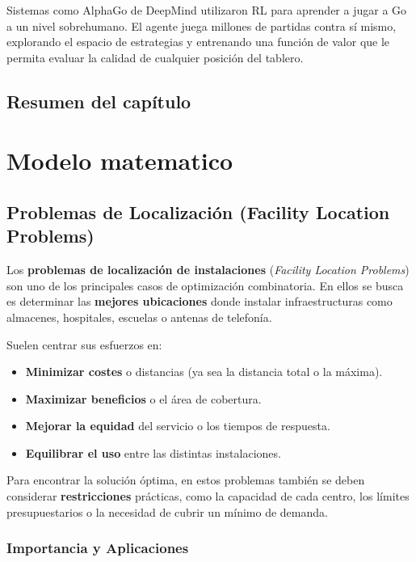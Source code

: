\documentclass[12pt,a4paper]{book}
\begin{document}
Sistemas como AlphaGo \cite{AlphaGo} de DeepMind utilizaron RL para aprender a jugar a Go a un nivel sobrehumano. El agente juega millones de partidas contra sí mismo, explorando el espacio de estrategias y entrenando una función de valor que le permita evaluar la calidad de cualquier posición del tablero.

\section{Resumen del capítulo}

\chapter{Modelo matematico}

\section{Problemas de Localización (Facility Location Problems)}

Los \textbf{problemas de localización de instalaciones} (\textit{Facility Location Problems}) son uno de los principales casos de optimización combinatoria. En ellos se busca es determinar las \textbf{mejores ubicaciones} donde instalar infraestructuras como almacenes, hospitales, escuelas o antenas de telefonía.

Suelen centrar sus esfuerzos en:
\begin{itemize}
    \item \textbf{Minimizar costes} o distancias (ya sea la distancia total o la máxima).
    \item \textbf{Maximizar beneficios} o el área de cobertura.
    \item \textbf{Mejorar la equidad} del servicio o los tiempos de respuesta.
    \item \textbf{Equilibrar el uso} entre las distintas instalaciones.
\end{itemize}

Para encontrar la solución óptima, en estos problemas también se deben considerar \textbf{restricciones} prácticas, como la capacidad de cada centro, los límites presupuestarios o la necesidad de cubrir un mínimo de demanda.

\hrulefill

\subsection{Importancia y Aplicaciones}
\end{document}

